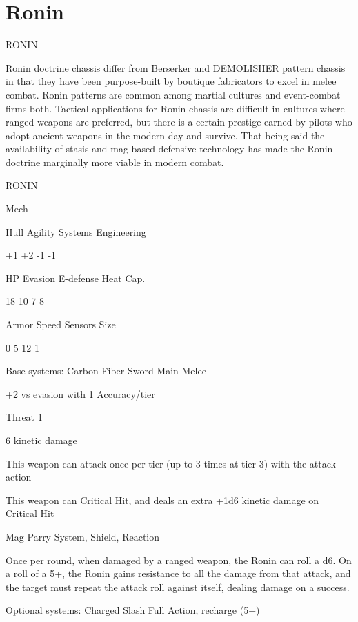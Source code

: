 \section{Ronin}

                                                  RONIN

Ronin doctrine chassis differ from Berserker and DEMOLISHER pattern chassis in that they have
been purpose-built by boutique fabricators to excel in melee combat. Ronin patterns are
common among martial cultures and event-combat firms both. Tactical applications for Ronin
chassis are difficult in cultures where ranged weapons are preferred, but there is a certain
prestige earned by pilots who adopt ancient weapons in the modern day and survive. That being
said the availability of stasis and mag based defensive technology has made the Ronin doctrine
marginally more viable in modern combat.


 RONIN

 Mech

 Hull       Agility      Systems       Engineering

 +1         +2           -1            -1

 HP         Evasion      E-defense     Heat Cap.

 18         10           7             8

 Armor      Speed        Sensors       Size

 0          5            12            1

Base systems:
Carbon Fiber Sword
Main Melee

+2 vs evasion with 1 Accuracy/tier

Threat 1

6 kinetic damage

This weapon can attack once per tier (up to 3 times at tier 3) with the attack action

This weapon can Critical Hit, and deals an extra +1d6 kinetic damage on Critical Hit


Mag Parry
System, Shield, Reaction

Once per round, when damaged by a ranged weapon, the Ronin can roll a d6. On a roll of a 5+,
the Ronin gains resistance to all the damage from that attack, and the target must repeat the
attack roll against itself, dealing damage on a success.


Optional systems:
Charged Slash
Full Action, recharge (5+)





